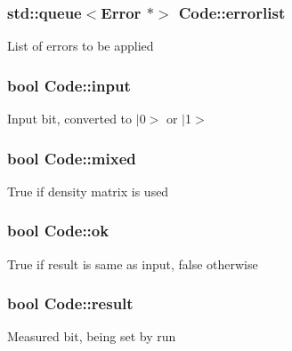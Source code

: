 \subsubsection[{\texorpdfstring{errorlist}{errorlist}}]{\setlength{\rightskip}{0pt plus 5cm}std\+::queue$<${\bf Error} $\ast$$>$ Code\+::errorlist\hspace{0.3cm}{\ttfamily [protected]}}\hypertarget{class_code_a8eed999145874a4fe25c8a3ad589d225}{}\label{class_code_a8eed999145874a4fe25c8a3ad589d225}
List of errors to be applied 
\subsubsection[{\texorpdfstring{input}{input}}]{\setlength{\rightskip}{0pt plus 5cm}bool Code\+::input\hspace{0.3cm}{\ttfamily [protected]}}\hypertarget{class_code_a0bdc22fcdc5b2a78a8ace1aea2d96d34}{}\label{class_code_a0bdc22fcdc5b2a78a8ace1aea2d96d34}
Input bit, converted to $\vert$0$>$ or $\vert$1$>$ 
\subsubsection[{\texorpdfstring{mixed}{mixed}}]{\setlength{\rightskip}{0pt plus 5cm}bool Code\+::mixed\hspace{0.3cm}{\ttfamily [protected]}}\hypertarget{class_code_a299e61614fc7ae8e3cbcba232d57d042}{}\label{class_code_a299e61614fc7ae8e3cbcba232d57d042}
True if density matrix is used 
\subsubsection[{\texorpdfstring{ok}{ok}}]{\setlength{\rightskip}{0pt plus 5cm}bool Code\+::ok\hspace{0.3cm}{\ttfamily [protected]}}\hypertarget{class_code_a62ce9f737b915662364116664261969a}{}\label{class_code_a62ce9f737b915662364116664261969a}
True if result is same as input, false otherwise 
\subsubsection[{\texorpdfstring{result}{result}}]{\setlength{\rightskip}{0pt plus 5cm}bool Code\+::result\hspace{0.3cm}{\ttfamily [protected]}}\hypertarget{class_code_ac65cd5a89311ea1059ba7d3772d812f9}{}\label{class_code_ac65cd5a89311ea1059ba7d3772d812f9}
Measured bit, being set by run 
